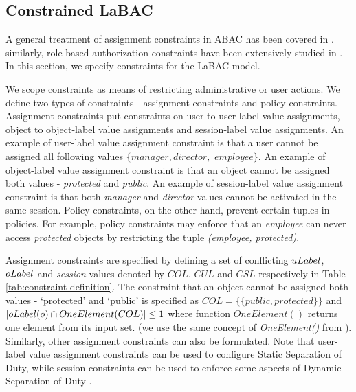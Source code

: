 	
	
	
	
	\subsection{Constrained LaBAC}
	A general treatment of assignment constraints in ABAC has been covered in  \cite{abcl}. similarly, role based authorization constraints have been extensively studied in \cite{rcl}.	
	In this section, we specify constraints for the LaBAC model. 
	
	We scope constraints as  means of restricting administrative or user actions. We define two types of constraints - assignment constraints and  policy constraints. Assignment constraints put constraints on user to user-label value assignments,  object to object-label value assignments and session-label value assignments. An example of user-label value assignment constraint is that a user cannot be assigned all following values $\{manager, director,$  $employee\}$.  An example of object-label value assignment constraint is that an object cannot be assigned both values - \textit{protected} and \textit{public}. An example of session-label value assignment constraint is that both \textit{manager} and \textit{director} values cannot be activated in the same session.	 Policy constraints, on the other hand,  prevent certain tuples in policies. For example, policy constraints may enforce that an \textit{employee} can never access \textit{protected} objects by restricting the tuple \textit{(employee, protected)}.  
	
	
	
	
		
		 
		 
	Assignment constraints are specified by defining a set of conflicting $uLabel$, $oLabel$ and \textit{session} values denoted by $COL$, $CUL$ and $CSL$ respectively in Table \ref{tab:constraint-definition}.  The constraint that an object cannot be assigned both values - `protected' and `public' is specified as $COL=\{\{public, protected\}\}$ and $ |oLabel(o) \cap OneElement(COL)| \le 1$ where function $OneElement()$ returns one element from its input set. (we use the same concept of \textit{OneElement()} from \cite{rcl}).  Similarly, other  assignment constraints can also be formulated. Note that user-label value assignment constraints can be used to configure  Static Separation of Duty, while session constraints can be used to enforce some aspects of  Dynamic Separation of Duty \cite{dsod}.

